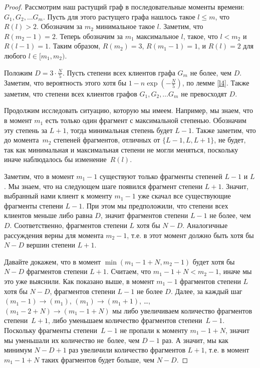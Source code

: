 \documentclass{matmex-diploma-custom}
\newcommand{\leqs}{\leqslant}
\theoremstyle{named}
\begin{document}
\begin{proof}
Рассмотрим наш растущий граф в последовательные моменты времени: $G_1, G_2, \dots G_m$. 
Пусть для этого растущего графа нашлось такое $l \leqs m$, что $ R(l) > 2$.
Обозначим за $m_2$ минимальное такое $l$. Заметим, что $R(m_2 - 1) = 2$. 
Теперь обозначим за $m_1$ максимальное $l$, такое, что $l < m_2$ и $R(l-1) = 1$.
Таким образом, $R(m_2) = 3$, $R(m_1 - 1) = 1$, и $R(l) = 2$ для любого $l \in [m_1, m_2)$.

Положим $D = 3 \cdot \frac{N}{5}$. Пусть степени всех клиентов графа $G_m$ не более, чем $D$. 
Заметим, что вероятность этого хотя бы $1 -  n\exp\left(-\frac{N}{5}\right)$, по лемме \ref{l4}.
Также заметим, что степени всех клиентов графов $G_1, G_2, \dots G_m$ не превосходят $D$.

Продолжим исследовать ситуацию, которую мы имеем. Например, мы знаем, что в момент $m_1$ есть 
только один фрагмент с максимальной степенью. Обозначим эту степень за $L + 1$, тогда минимальная степень будет $L - 1$.
Также заметим, что до момента~$m_2$ степеней фрагментов, отличных от $\{L-1, L, L+1\}$, не будет, 
так как минимальная и максимальная степени не могли меняться, поскольку иначе наблюдалось бы изменение~$R(l)$. 

Заметим, что в момент $m_1 - 1$ существуют только фрагменты степеней $L-1$ и $L$.
Мы знаем, что на следующем шаге появился фрагмент степени $L+1$. 
Значит, выбранный нами клиент к моменту $m_1 - 1$ уже скачал все существующие фрагменты степени $L-1$. 
При этом мы предположили, что степени всех клиентов меньше либо равна $D$, значит фрагментов степени $L-1$ не более, чем $D$.
Соответственно, фрагментов степени $L$ хотя бы $N - D$.
Аналогичные рассуждения верны для момента $m_2 - 1$, 
т.е. в этот момент должно быть хотя бы $N - D$ вершин степени $L+1$. 

Давайте докажем, что в момент $\min(m_1 - 1 + N, m_2 - 1)$ будет хотя бы $N-D$ фрагментов степени $L+1$.
Считаем, что $m_1 - 1 + N < m_2 - 1$, иначе мы это уже выяснили.
Как показано выше, в момент $m_1 - 1$ фрагментов степени $L$ хотя бы $N-D$, фрагментов степени $L - 1$ не более $D$. 
Далее, за каждый шаг $(m_1 - 1) \to (m_1)$, $(m_1) \to (m_1 + 1)$, \dots, $(m_1 - 2 + N) \to (m_1 - 1 + N)$ 
мы либо увеличиваем количество фрагментов степени~$L+1$, либо уменьшаем количество фрагментов степени~$L-1$.
Поскольку фрагменты степени~$L-1$ не пропали к моменту $m_1 - 1 + N$, значит мы уменьшали их количество не~более, чем $D - 1$ раз.
А значит, мы как минимум $N-D + 1$ раз увеличили количество фрагментов $L+1$, 
т.е. в момент $m_1 - 1 + N$ таких фрагментов будет больше, чем $N - D$.


\end{proof}
\end{document}
